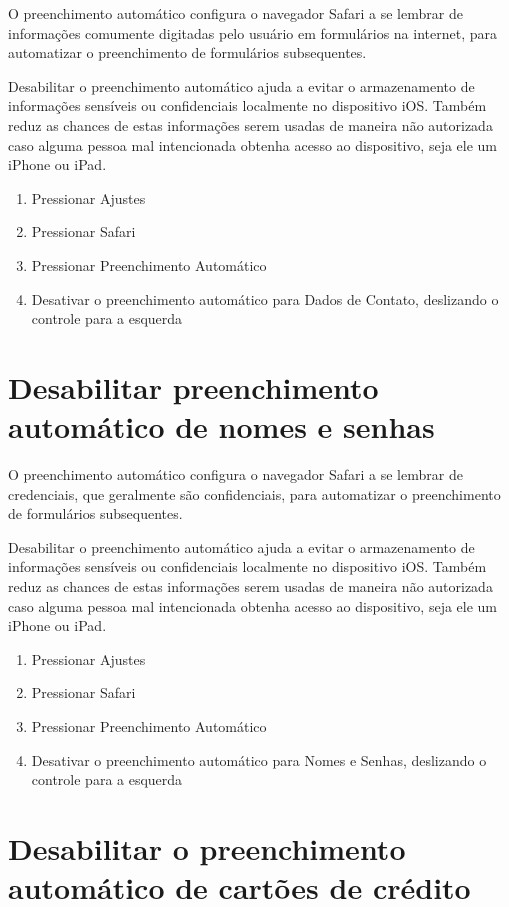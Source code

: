 O preenchimento autom\'atico configura o navegador Safari a se lembrar de informa\c c\~oes comumente digitadas pelo usu\'ario em formul\'arios na internet, para automatizar o preenchimento de formul\'arios subsequentes.

Desabilitar o preenchimento autom\'atico ajuda a evitar o armazenamento de informa\c c\~oes sens\'iveis ou confidenciais localmente no dispositivo iOS. Tamb\'em reduz as chances de estas informa\c c\~oes serem usadas de maneira n\~ao autorizada caso alguma pessoa mal intencionada obtenha acesso ao dispositivo, seja ele um iPhone ou iPad. 

\begin{enumerate}
\item Pressionar Ajustes
\item Pressionar Safari
\item Pressionar Preenchimento Autom\'atico
\item Desativar o preenchimento autom\'atico para Dados de Contato, deslizando o controle para a esquerda
\end{enumerate}

\section{Desabilitar preenchimento autom\'atico de nomes e senhas}

O preenchimento autom\'atico configura o navegador Safari a se lembrar de credenciais, que geralmente s\~ao confidenciais, para automatizar o preenchimento de formul\'arios subsequentes.

Desabilitar o preenchimento autom\'atico ajuda a evitar o armazenamento de informa\c c\~oes sens\'iveis ou confidenciais localmente no dispositivo iOS. Tamb\'em reduz as chances de estas informa\c c\~oes serem usadas de maneira n\~ao autorizada caso alguma pessoa mal intencionada obtenha acesso ao dispositivo, seja ele um iPhone ou iPad. 

\begin{enumerate}
\item Pressionar Ajustes
\item Pressionar Safari
\item Pressionar Preenchimento Autom\'atico
\item Desativar o preenchimento autom\'atico para Nomes e Senhas, deslizando o controle para a esquerda
\end{enumerate}

\section{Desabilitar o preenchimento autom\'atico de cart\~oes de cr\'edito}

